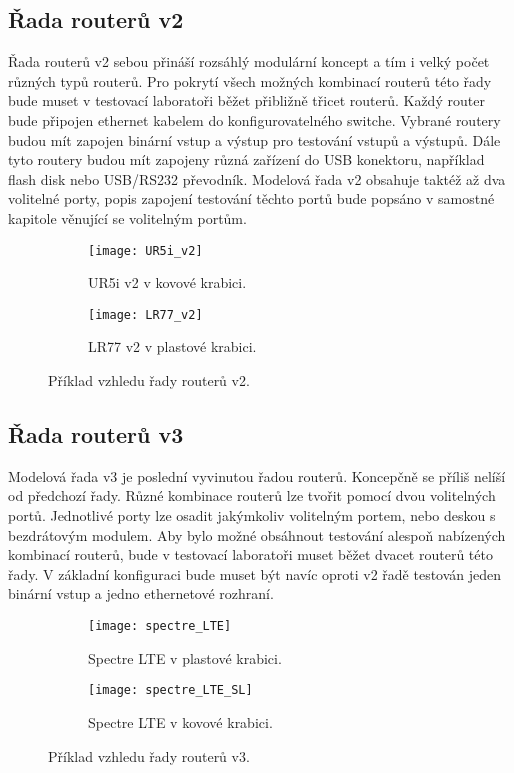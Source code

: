 \subsection{Řada routerů v2}
Řada routerů v2 sebou přináší rozsáhlý modulární koncept a tím i velký počet různých typů routerů. Pro pokrytí všech možných kombinací routerů této řady bude muset v testovací laboratoři běžet přibližně třicet routerů. Každý router bude připojen ethernet kabelem do konfigurovatelného switche. Vybrané routery budou mít zapojen binární vstup a výstup pro testování vstupů a výstupů. Dále tyto routery budou mít zapojeny různá zařízení do USB konektoru, například flash disk nebo USB/RS232 převodník. Modelová řada v2 obsahuje taktéž až dva volitelné porty, popis zapojení testování těchto portů bude popsáno v samostné kapitole věnující se volitelným portům.

\begin{figure}[h]
  \begin{subfigure}[h]{0.5\LW}
    \centering
    \texttt{[image: UR5i\_v2]}
    \caption{UR5i v2 v kovové krabici.}
    \label{fig:UR5i_v2}
  \end{subfigure}
  \begin{subfigure}[h]{0.5\LW}
    \centering
    \texttt{[image: LR77\_v2]}
    \caption{LR77 v2 v plastové krabici.}
    \label{fig:LR77_v2}
  \end{subfigure}
  \caption{Příklad vzhledu řady routerů v2.}
  \label{fig:UR5i_v2}
\end{figure}

\subsection{Řada routerů v3}
Modelová řada v3 je poslední vyvinutou řadou routerů. Koncepčně se příliš nelíší od předchozí řady. Různé kombinace routerů lze tvořit pomocí dvou volitelných portů. Jednotlivé porty lze osadit jakýmkoliv volitelným portem, nebo deskou s bezdrátovým modulem. Aby bylo možné obsáhnout testování alespoň nabízených kombinací routerů, bude v testovací laboratoři muset běžet dvacet routerů této řady. V základní konfiguraci bude muset být navíc oproti v2 řadě testován jeden binární vstup a jedno ethernetové rozhraní.

\begin{figure}[h]
  \begin{subfigure}[h]{0.5\LW}
    \centering
    \texttt{[image: spectre\_LTE]}
    \caption{Spectre LTE v plastové krabici.}
    \label{fig:spectre_LTE}
  \end{subfigure}
  \begin{subfigure}[h]{0.5\LW}
    \centering
    \texttt{[image: spectre\_LTE\_SL]}
    \caption{Spectre LTE v kovové krabici.}
    \label{fig:spectre_LTE_SL}
  \end{subfigure}
  \caption{Příklad vzhledu řady routerů v3.}
  \label{fig:spectre_LTE}
\end{figure}

